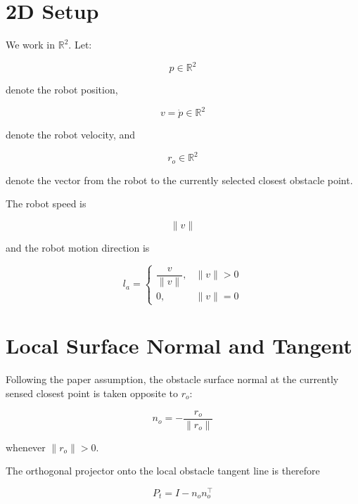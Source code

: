 \documentclass[11pt]{article}
\begin{document}
\section*{2D Setup}

We work in \(\mathbb{R}^2\). Let:

\begin{equation}
p \in \mathbb{R}^2
\end{equation}

denote the robot position,

\begin{equation}
v = \dot{p} \in \mathbb{R}^2
\end{equation}

denote the robot velocity, and

\begin{equation}
r_o \in \mathbb{R}^2
\end{equation}

denote the vector from the robot to the currently selected closest obstacle
point.

The robot speed is

\begin{equation}
\lVert v \rVert
\end{equation}

and the robot motion direction is

\begin{equation}
l_a =
\begin{cases}
\dfrac{v}{\lVert v \rVert}, & \lVert v \rVert > 0 \\
0, & \lVert v \rVert = 0
\end{cases}
\end{equation}

\section*{Local Surface Normal and Tangent}

Following the paper assumption, the obstacle surface normal at the currently
sensed closest point is taken opposite to \(r_o\):

\begin{equation}
n_o = -\frac{r_o}{\lVert r_o \rVert}
\end{equation}

whenever \(\lVert r_o \rVert > 0\).

The orthogonal projector onto the local obstacle tangent line is therefore

\begin{equation}
P_t = I - n_o n_o^\top
\end{equation}
\end{document}
